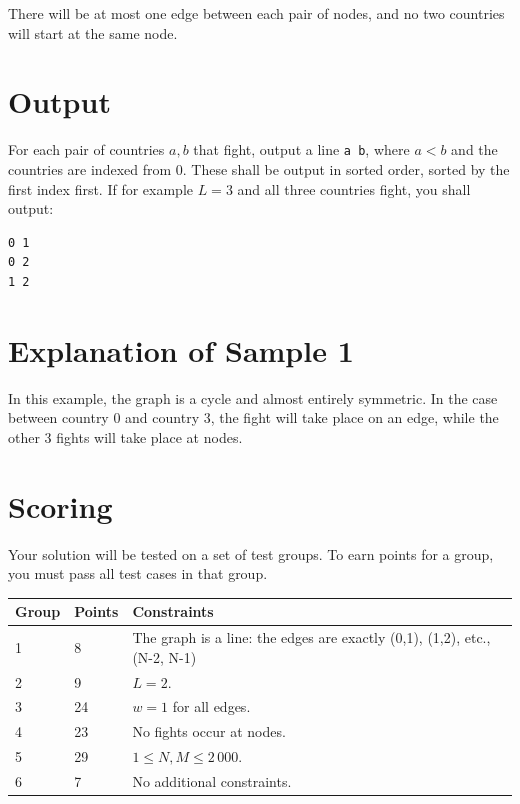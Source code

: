There will be at most one edge between each pair of nodes, and no two countries will start at the same node.

\section*{Output}

For each pair of countries $a, b$ that fight, output a line \texttt{a b}, where $a < b$ and the countries are indexed from 0.
These shall be output in sorted order, sorted by the first index first.
If for example $L = 3$ and all three countries fight, you shall output:
\begin{lstlisting}
0 1
0 2
1 2
\end{lstlisting}

\section*{Explanation of Sample 1}

In this example, the graph is a cycle and almost entirely symmetric. In the case between
country 0 and country 3, the fight will take place on an edge, while the other 3 fights
will take place at nodes.

\section*{Scoring}
Your solution will be tested on a set of test groups. To earn points for a group, you must pass all test cases in that group.

\noindent
\begin{tabular}{| l | l | l |}
\hline
Group & Points & Constraints \\ \hline
1     & 8          & The graph is a line: the edges are exactly (0,1), (1,2), etc., (N-2, N-1) \\ \hline
2     & 9          & $L = 2$. \\ \hline
3     & 24         & $w = 1$ for all edges. \\ \hline
4     & 23         & No fights occur at nodes. \\ \hline
5     & 29         & $1 \le N, M \le 2\,000$. \\ \hline
6     & 7          & No additional constraints. \\ \hline
\end{tabular}
